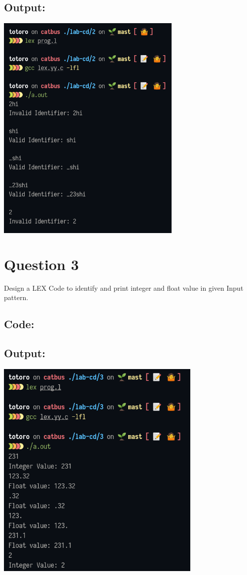 \documentclass{article}
\begin{document}
\subsection*{Output:}
% 
\begin{center}
  \includegraphics[width=9cm]{2/out.png}
\end{center}

\newpage
\section*{Question 3}
Design a LEX Code to identify and print integer and float
value in given Input pattern.
\subsection*{Code:}

\subsection*{Output:}
% 
\begin{center}
  \includegraphics[width=10cm]{3/out.png}
\end{center}
\end{document}
